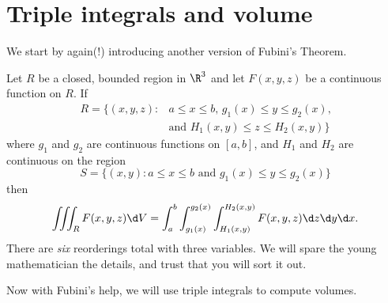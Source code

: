 \documentclass{ximera}
\begin{document}
\section{Triple integrals and volume}

We start by again(!) introducing another version of Fubini's Theorem.

\begin{theorem}[Fubini]
  Let $R$ be a closed, bounded region in $\R^3$ and let $F(x,y,z)$ be
  a continuous function on $R$. If
    \begin{align*}
      R=\{(x,y,z):&\text{$a\leq x\leq b$, $g_1(x)\leq y\leq g_2(x)$,}\\
        &\text{and $H_1(x,y) \leq z \leq H_2(x,y)$}\}
    \end{align*}
    where $g_1$ and $g_2$ are continuous functions on $[a,b]$, and $H_1$ and $H_2$ are continuous on the region
    \[
    S =\{(x,y):\text{$a\leq x\leq b$ and $g_1(x)\leq y\leq g_2(x)$}\}
    \]
    then
    \[
    \iiint_R F(x,y,z) \d V = \int_a^b\int_{g_1(x)}^{g_2(x)}\int_{H_1(x,y)}^{H_2(x,y)} F(x,y,z)\d z\d y\d x.
    \]
    There are \textit{six} reorderings total with three variables. We will spare
    the young mathematician the details, and trust that you will sort
    it out.
\end{theorem}

Now with Fubini's help, we will use triple integrals to compute
volumes.
\end{document}
